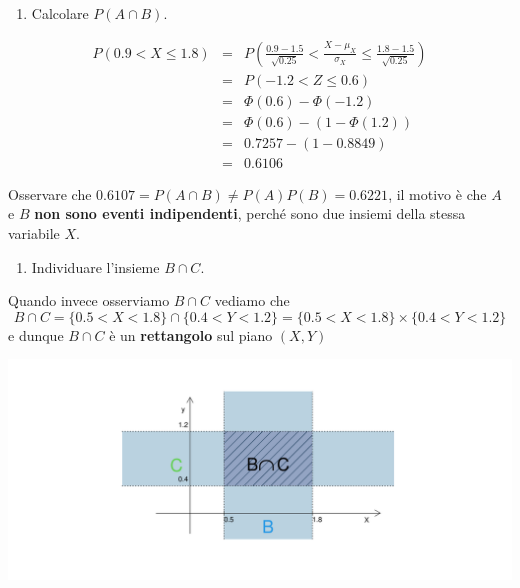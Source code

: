 \documentclass[
  11pt,
]{book}
\providecommand{\tightlist}{%
  \setlength{\itemsep}{0pt}\setlength{\parskip}{0pt}}
\theoremstyle{mytheoremstyle}
\theoremstyle{mydefstyle}
\begin{document}
\begin{enumerate}
\def\labelenumi{\arabic{enumi}.}
\setcounter{enumi}{4}
\tightlist
\item
  Calcolare \(P(A\cap B)\).
\end{enumerate}

\begin{eqnarray*}
   P( 0.9 < X \leq  1.8 ) &=& P\left( \frac { 0.9  -  1.5 }{\sqrt{ 0.25 }} < \frac { X  -  \mu_X }{ \sigma_X } \leq \frac { 1.8  -  1.5 }{\sqrt{ 0.25 }}\right)  \\
              &=& P\left(  -1.2  < Z \leq  0.6 \right) \\
              &=& \Phi( 0.6 )-\Phi( -1.2 )\\
              &=&  \Phi( 0.6 )-(1-\Phi( 1.2 )) \\ &=&  0.7257 -(1- 0.8849 ) \\ 
              &=&  0.6106 
   \end{eqnarray*}

Osservare che \(0.6107=P(A\cap B)\neq P(A)P(B)=0.6221\), il motivo è che \(A\) e \(B\) \textbf{non sono eventi indipendenti}, perché sono due insiemi della stessa variabile \(X\).

\begin{enumerate}
\def\labelenumi{\arabic{enumi}.}
\setcounter{enumi}{5}
\tightlist
\item
  Individuare l'insieme \(B\cap C\).
\end{enumerate}

Quando invece osserviamo \(B\cap C\) vediamo che
\[B\cap C=\{0.5<X<1.8\}\cap\{0.4<Y< 1.2\}= \{0.5<X<1.8\}\times\{0.4<Y< 1.2\} \]
e dunque \(B\cap C\) è un \textbf{rettangolo} sul piano \((X,Y)\)

\begin{center}\includegraphics{Appunti_di_Statistica_2025_files/figure-latex/07d-Esercizi-Normale-7,-1} \end{center}
\end{document}
